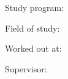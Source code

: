 

Study program: \myStudyProgram

Field of study: \myStudyField

Worked out at: \myFaculty

Supervisor: \mySupervisor

\medskip{}

\myDate


\newpage
\thispagestyle{empty}
\mbox{}
\newpage


